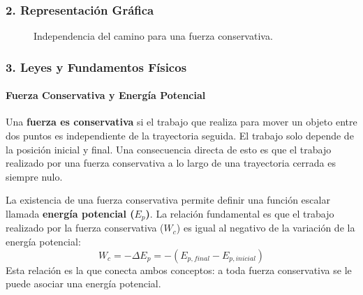 \subsubsection*{2. Representación Gráfica}
\begin{figure}[H]
    \centering
    \caption{Independencia del camino para una fuerza conservativa.}
\end{figure}

\subsubsection*{3. Leyes y Fundamentos Físicos}
\paragraph*{Fuerza Conservativa y Energía Potencial}
Una \textbf{fuerza es conservativa} si el trabajo que realiza para mover un objeto entre dos puntos es independiente de la trayectoria seguida. El trabajo solo depende de la posición inicial y final. Una consecuencia directa de esto es que el trabajo realizado por una fuerza conservativa a lo largo de una trayectoria cerrada es siempre nulo.

La existencia de una fuerza conservativa permite definir una función escalar llamada \textbf{energía potencial ($E_p$)}. La relación fundamental es que el trabajo realizado por la fuerza conservativa ($W_c$) es igual al negativo de la variación de la energía potencial:
$$ W_{c} = -\Delta E_p = -(E_{p, final} - E_{p, inicial}) $$
Esta relación es la que conecta ambos conceptos: a toda fuerza conservativa se le puede asociar una energía potencial.

